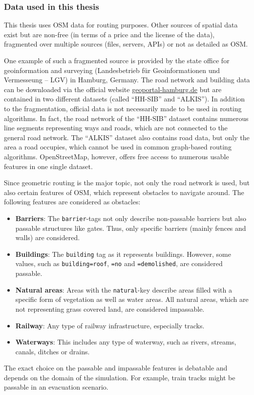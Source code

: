 		\subsubsection{Data used in this thesis}
		
			This thesis uses OSM data for routing purposes.
			Other sources of spatial data exist but are non-free (in terms of a price and the license of the data), fragmented over multiple sources (files, servers, APIs) or not as detailed as OSM.
			
			One example of such a fragmented source is provided by the state office for geoinformation and surveying (Landesbetrieb für Geoinformationen und Vermesseung -- LGV) in Hamburg, Germany.
			The road network and building data can be downloaded via the official website \href{https://geoportal-hamburg.de}{geoportal-hamburg.de} but are contained in two different datasets (called \enquote{HH-SIB} and \enquote{ALKIS}).
			In addition to the fragmentation, official data is not necessarily made to be used in routing algorithms.
			In fact, the road network of the \enquote{HH-SIB} dataset contains numerous line segments representing ways and roads, which are not connected to the general road network.
			The \enquote{ALKIS} dataset also contains road data, but only the area a road occupies, which cannot be used in common graph-based routing algorithms.
			OpenStreetMap, however, offers free access to numerous usable features in one single dataset.
			
			Since geometric routing is the major topic, not only the road network is used, but also certain features of OSM, which represent obstacles to navigate around.
			The following features are considered as obstacles:
			\begin{itemize}
				\item \textbf{Barriers}: The \texttt{barrier}-tags not only describe non-passable barriers but also passable structures like gates. Thus, only specific barriers (mainly fences and walls) are considered.
				\item \textbf{Buildings}: The \texttt{building} tag as it represents buildings. However, some values, such as \texttt{building=roof}, \texttt{=no} and \texttt{=demolished}, are considered passable.
				\item \textbf{Natural areas}: Areas with the \texttt{natural}-key describe areas filled with a specific form of vegetation as well as water areas. All natural areas, which are not representing grass covered land, are considered impassable.
				\item \textbf{Railway}: Any type of railway infrastructure, especially tracks.
				\item \textbf{Waterways}: This includes any type of waterway, such as rivers, streams, canals, ditches or drains.
			\end{itemize}
			The exact choice on the passable and impassable features is debatable and depends on the domain of the simulation.
			For example, train tracks might be passable in an evacuation scenario.
			
